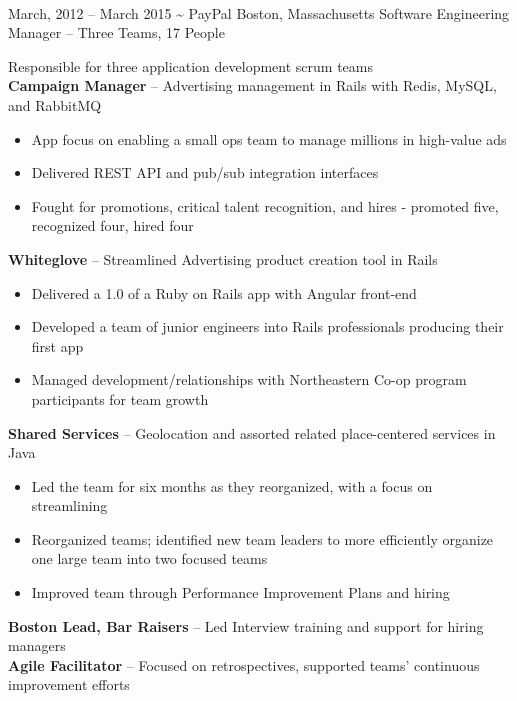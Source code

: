 \documentclass[]{friggeri-cv}
\begin{document}
\begin{entrylist}
  \\[0.8cm]%
  \entryalt
    {March, 2012 -- March 2015}
    {\textbf{\textasciitilde} PayPal}
    {Boston, Massachusetts}
    {Software Engineering Manager -- Three Teams, 17 People}
    {Responsible for three application development scrum teams \\
      \textbf{Campaign Manager} -- Advertising management in Rails with Redis, MySQL,
      and RabbitMQ
    \begin{itemize}
      \item App focus on enabling a small ops team to manage millions in
        high-value ads
      \item Delivered REST API and pub/sub integration interfaces
      \item Fought for promotions, critical talent recognition, and hires - promoted five, recognized four, hired four
    \end{itemize}
      \textbf{Whiteglove} -- Streamlined Advertising product creation tool in Rails 
    \begin{itemize}
      \item Delivered a 1.0 of a Ruby on Rails app with Angular front-end
      \item Developed a team of junior engineers into Rails professionals producing their first app
      \item Managed development/relationships with Northeastern Co-op program
        participants for team growth
    \end{itemize} 
      \textbf{Shared Services} -- Geolocation and assorted related place-centered
      services in Java
    \begin{itemize}
      \item Led the team for six months as they reorganized, with a focus on
        streamlining
      \item Reorganized teams; identified new team leaders to more efficiently organize one large team into two focused teams
      \item Improved team through Performance Improvement Plans and hiring
    \end{itemize}
    \textbf{Boston Lead, Bar Raisers} -- Led Interview training and support for hiring managers\\
    \textbf{Agile Facilitator} -- Focused on retrospectives, supported teams' continuous improvement efforts}


\end{entrylist}
\end{document}
